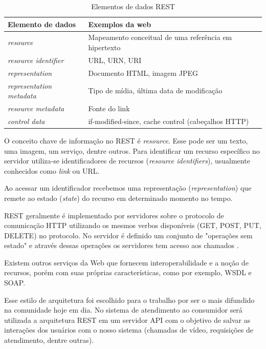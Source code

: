 \begin{table}[ht!]
	\centering
	\begin{tabular}{@{}ll@{}}
		\toprule
		\textbf{Elemento de dados}       & \textbf{Exemplos da web}       \\ \midrule
		\textit{resource}                & Mapeamento conceitual de uma referência em hipertexto   \\
		\textit{resource identifier}     & URL, URN, URI                                      \\
		\textit{representation}          & Documento HTML, imagem JPEG                        \\
		\textit{representation metadata} & Tipo de mídia, última data de modificação          \\
		\textit{resource metadata}       & Fonte do link    \\
		\textit{control data}            & if-modified-since, cache control (cabeçalhos HTTP) \\ 
        \bottomrule
	\end{tabular}
	\caption{Elementos de dados REST}
    \label{table:elemento-de-dados-rest}
\end{table}

O conceito chave de informação no REST é \textit{resource}. Esse pode ser um texto, uma imagem, um serviço, dentre outros. Para identificar um recurso específico no servidor utiliza-se identificadores de recursos (\textit{resource identifiers}), usualmente conhecidos como \textit{link} ou URL. 

Ao acessar um identificador recebemos uma representação (\textit{representation}) que remete ao estado (\textit{state}) do recurso em determinado momento no tempo. 

REST geralmente é implementado por servidores sobre o protocolo de comunicação HTTP utilizando os mesmos verbos disponíveis (GET, POST, PUT, DELETE) no protocolo. No servidor é definido um conjunto de "operações sem estado" e através dessas operações os servidores tem acesso aos chamados .

Existem outros serviços da Web que fornecem interoperabilidade e a noção de recursos, porém com suas próprias características, como por exemplo, WSDL e SOAP.

Esse estilo de arquitetura foi escolhido para o trabalho por ser o mais difundido na comunidade hoje em dia. No sistema de atendimento ao consumidor será utilizada a arquitetura REST em um servidor API com o objetivo de salvar as interações dos usuários com o nosso sistema (chamadas de vídeo, requisições de atendimento, dentre outras).

